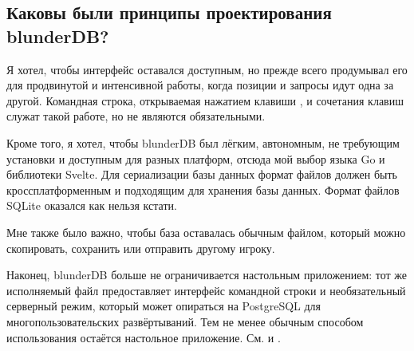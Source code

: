 \documentclass[letterpaper,10pt,russian]{sphinxmanual}
\begin{document}
\subsection{Каковы были принципы проектирования blunderDB?}
\label{\detokenize{faq:quelles-ont-ete-les-principes-de-conception-de-blunderdb}}
\sphinxAtStartPar
Я хотел, чтобы интерфейс оставался доступным, но прежде всего продумывал его для продвинутой и интенсивной работы, когда позиции и запросы идут одна за другой. Командная строка, открываемая нажатием клавиши , и сочетания клавиш служат такой работе, но не являются обязательными.

\sphinxAtStartPar
Кроме того, я хотел, чтобы blunderDB был лёгким, автономным, не требующим установки и доступным для разных платформ, отсюда мой выбор языка Go и библиотеки Svelte. Для сериализации базы данных формат файлов должен быть кроссплатформенным и подходящим для хранения базы данных. Формат файлов SQLite оказался как нельзя кстати.

\sphinxAtStartPar
Мне также было важно, чтобы база оставалась обычным файлом, который можно скопировать, сохранить или отправить другому игроку.

\sphinxAtStartPar
Наконец, blunderDB больше не ограничивается настольным приложением: тот же исполняемый файл предоставляет интерфейс командной строки и необязательный серверный режим, который может опираться на PostgreSQL для многопользовательских развёртываний. Тем не менее обычным способом использования остаётся настольное приложение. См. {\hyperref[\detokenize{cli:cli}]{}} и {\hyperref[\detokenize{mode_headless:headless}]{}}.
\end{document}
